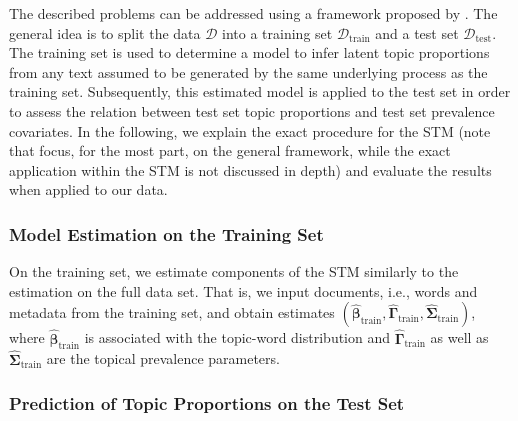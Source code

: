 The described problems can be addressed using a framework proposed by \cite{egami2018make}. The general idea is to split the data $\mathcal{D}$ into a training set $\mathcal{D}_{\text{train}}$ and a test set $\mathcal{D}_{\text{test}}$. The training set is used to determine a model to infer latent topic proportions from any text assumed to be generated by the same underlying process as the training set. Subsequently, this estimated model is applied to the test set in order to assess the relation between test set topic proportions and test set prevalence covariates. In the following, we explain the exact procedure for the STM (note that \cite{egami2018make} focus, for the most part, on the general framework, while the exact application within the STM is not discussed in depth) and evaluate the results when applied to our data. 

\subsubsection{Model Estimation on the Training Set}
\label{Model Estimation on the Training Set}

On the training set, we estimate components of the STM similarly to the estimation on the full data set. That is, we input documents, i.e., words and metadata from the training set, and obtain estimates $(\hat{\boldsymbol{\beta}}_{\text{train}}, \hat{\boldsymbol{\Gamma}}_{\text{train}}, \hat{\boldsymbol{\Sigma}}_{\text{train}})$, where $\hat{\boldsymbol{\beta}}_{\text{train}}$ is associated with the topic-word distribution and $\hat{\boldsymbol{\Gamma}}_{\text{train}}$ as well as $\hat{\boldsymbol{\Sigma}}_{\text{train}}$ are the topical prevalence parameters. 

\subsubsection{Prediction of Topic Proportions on the Test Set}
\label{Prediction of Topic Proportions on the Test Set}

